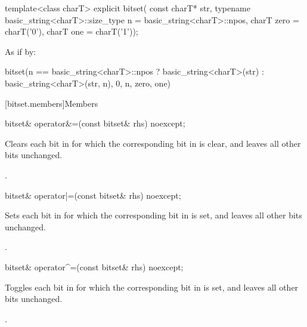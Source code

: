 %
\begin{itemdecl}
template<class charT>
  explicit bitset(
    const charT* str,
    typename basic_string<charT>::size_type n = basic_string<charT>::npos,
    charT zero = charT('0'),
    charT one = charT('1'));
\end{itemdecl}

\begin{itemdescr}
\pnum
\effects
As if by:
\begin{codeblock}
bitset(n == basic_string<charT>::npos
          ? basic_string<charT>(str)
          : basic_string<charT>(str, n),
       0, n, zero, one)
\end{codeblock}
\end{itemdescr}


[bitset.members]{Members}

%
\begin{itemdecl}
bitset& operator&=(const bitset& rhs) noexcept;
\end{itemdecl}

\begin{itemdescr}
\pnum
\effects
Clears each bit in
for which the corresponding bit in  is clear, and leaves all other bits unchanged.

\pnum
\returns
{}.
\end{itemdescr}

%
\begin{itemdecl}
bitset& operator|=(const bitset& rhs) noexcept;
\end{itemdecl}

\begin{itemdescr}
\pnum
\effects
Sets each bit in
for which the corresponding bit in  is set, and leaves all other bits unchanged.

\pnum
\returns
{}.
\end{itemdescr}

%
\begin{itemdecl}
bitset& operator^=(const bitset& rhs) noexcept;
\end{itemdecl}

\begin{itemdescr}
\pnum
\effects
Toggles each bit in
for which the corresponding bit in  is set, and leaves all other bits unchanged.

\pnum
\returns
{}.
\end{itemdescr}

